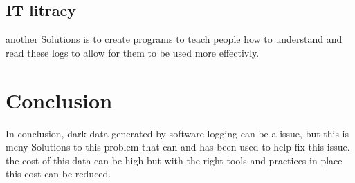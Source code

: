 \documentclass{article}
\begin{document}
\subsection{IT litracy}
another Solutions is to create programs to teach people how to understand and read these logs to allow for them to be used more effectivly.

\section{Conclusion}
In conclusion, dark data generated by software logging can be a issue, but this is meny Solutions to this problem that can and has been used to help fix this
issue. the cost of this data can be high but with the right tools and practices in place this cost can be reduced.

\printbibliography
\end{document}
